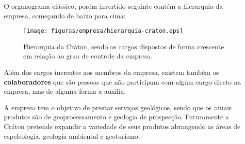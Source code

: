   O organograma clássico, porém invertido seguinte contém a hierarquia da empresa, começando
  de baixo para cima:

  \begin{figure}[!ht]
    \centering
    \texttt{[image: figuras/empresa/hierarquia-craton.eps]}
    \caption{Hierarquia da Cráton, sendo os cargos dispostos de forma crescente em relação ao grau
              de controle da empresa.}
  \end{figure}

  Além dos cargos inerentes aos membros da empresa, existem também os \textbf{colaboradores}
  que são pessoas que não participam com algum cargo direto na empresa, mas de alguma forma
  a auxilia.

  A empresa tem o objetivo de prestar serviços geológicos, sendo que os atuais produtos são
  de geoprocessamento e geologia de prospecção. Futuramente a Cráton pretende expandir a
  variedade de seus produtos abrangendo as áreas de espeleologia, geologia ambiental e
  geoturismo.
